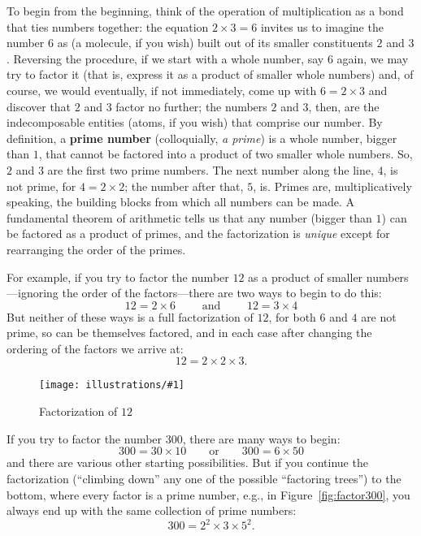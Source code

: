 \documentclass[11pt]{article}
\newcommand{\ill}[3]{ 
   \begin{figure}[H]
   \begin{center}
   \texttt{[image: illustrations/\#1]}
   \caption{#3}
   \end{center}
    \end{figure}
}
\theoremstyle{plain}
\theoremstyle{definition}
\numberwithin{equation}{section}
\numberwithin{figure}{section}
\numberwithin{table}{section}
\begin{document}
 To begin from the beginning, think
of the operation of multiplication as a bond that ties numbers
together: the equation $2\times 3= 6$ invites us to imagine the number
$6$ as (a molecule, if you wish) built out of its smaller constituents
$2$ and $3$.  Reversing the procedure, if we start with a whole
number, say $6$ again, we may try to factor it (that is, express it as
a product of smaller whole numbers) and, of course, we would
eventually, if not immediately, come up with $6 = 2\times 3$ and
discover that $2$ and $3$ factor no further; the numbers $2$ and $3$,
then, are the indecomposable entities (atoms, if you wish) that
comprise our number.  By definition, a {\bf prime number}
(colloquially, {\em a prime}) is a whole number, bigger than $1$, that
cannot be factored into a product of two smaller whole numbers. So,
$2$ and $3$ are the first two prime numbers. The next number along the
line, $4$, is not prime, for $4= 2\times 2$; the number after that,
$5$, is. Primes are, multiplicatively speaking, the building blocks
from which all numbers can be made. A fundamental theorem of
arithmetic tells us that any number (bigger than $1$) can be factored
as a product of primes, and the factorization is {\em unique} except
for rearranging the order of the primes. 

For example, if you try to factor the number $12$ as a product of
smaller numbers---ignoring the order of the factors---there are two
ways to begin to do this:
$$
  12 = 2 \times 6 \qquad\text{ and }\qquad   12 = 3 \times 4
$$
But neither of these ways is a full factorization of $12$, for both
$6$ and $4$ are not prime, so can be themselves factored, and in each
case after changing the ordering of the factors we arrive at:
$$
   12= 2 \times 2 \times 3.
$$
\ill{factor_tree_12}{0.5}{Factorization of $12$}

If you try to factor the number $300$, there are many
ways to begin:
$$
  300= 30\times 10\qquad\text{or}\qquad 300 = 6 \times 50
$$
and there are various other starting possibilities. But if you continue the factorization (``climbing down'' any one of 
the possible ``factoring trees'') to the bottom, where every factor is a prime number, e.g., in
Figure~\ref{fig:factor300},
you always end up with the same collection of prime numbers:                  
                 $$300 = 2^2\times 3\times 5^2.$$   
\end{document}

